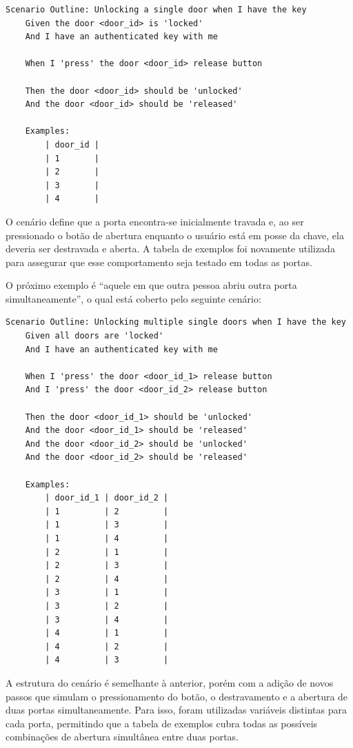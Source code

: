 \begin{verbatim}
Scenario Outline: Unlocking a single door when I have the key
    Given the door <door_id> is 'locked'
    And I have an authenticated key with me

    When I 'press' the door <door_id> release button

    Then the door <door_id> should be 'unlocked'
    And the door <door_id> should be 'released'

    Examples:
        | door_id |
        | 1       |
        | 2       |
        | 3       |
        | 4       |
\end{verbatim}

O cenário define que a porta encontra-se inicialmente travada e, ao ser pressionado o botão de abertura enquanto o usuário está em posse da chave, ela deveria 
ser destravada e aberta. A tabela de exemplos foi novamente utilizada para assegurar que esse comportamento seja testado em todas as portas.

O próximo exemplo é “aquele em que outra pessoa abriu outra porta simultaneamente”, o qual está coberto pelo seguinte cenário:

\begin{verbatim}
Scenario Outline: Unlocking multiple single doors when I have the key   
    Given all doors are 'locked'
    And I have an authenticated key with me

    When I 'press' the door <door_id_1> release button
    And I 'press' the door <door_id_2> release button

    Then the door <door_id_1> should be 'unlocked'
    And the door <door_id_1> should be 'released'
    And the door <door_id_2> should be 'unlocked'
    And the door <door_id_2> should be 'released'

    Examples:
        | door_id_1 | door_id_2 |
        | 1         | 2         |
        | 1         | 3         |
        | 1         | 4         |
        | 2         | 1         |
        | 2         | 3         |
        | 2         | 4         |
        | 3         | 1         |
        | 3         | 2         |
        | 3         | 4         |
        | 4         | 1         |
        | 4         | 2         |
        | 4         | 3         |
\end{verbatim}

A estrutura do cenário é semelhante à anterior, porém com a adição de novos passos que simulam o pressionamento do botão, o destravamento e a abertura de duas 
portas simultaneamente. Para isso, foram utilizadas variáveis distintas para cada porta, permitindo que a tabela de exemplos cubra todas as possíveis combinações 
de abertura simultânea entre duas portas.

